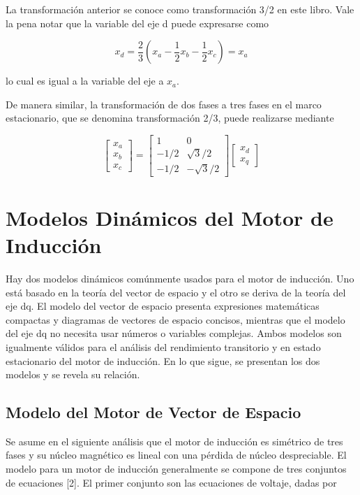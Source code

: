 \documentclass[letterpaper,12pt]{article} %
\begin{document}
La transformación anterior se conoce como transformación 3/2 en este libro. Vale la pena notar que la variable del eje d puede expresarse como

\[
x_d = \frac{2}{3} \left( x_a - \frac{1}{2}x_b - \frac{1}{2}x_c \right) = x_a \tag{14.2-7}
\]

lo cual es igual a la variable del eje a \(x_a\).

De manera similar, la transformación de dos fases a tres fases en el marco estacionario, que se denomina transformación 2/3, puede realizarse mediante

\[
\begin{bmatrix}
x_a \\
x_b \\
x_c 
\end{bmatrix} 
= 
\begin{bmatrix}
1 & 0 \\
-1/2 & \sqrt{3}/2 \\
-1/2 & -\sqrt{3}/2
\end{bmatrix}
\begin{bmatrix}
x_d \\
x_q 
\end{bmatrix} \tag{14.2-8}
\]

\section{Modelos Dinámicos del Motor de Inducción}

Hay dos modelos dinámicos comúnmente usados para el motor de inducción. Uno está basado en la teoría del vector de espacio y el otro se deriva de la teoría del eje dq. El modelo del vector de espacio presenta expresiones matemáticas compactas y diagramas de vectores de espacio concisos, mientras que el modelo del eje dq no necesita usar números o variables complejas. Ambos modelos son igualmente válidos para el análisis del rendimiento transitorio y en estado estacionario del motor de inducción. En lo que sigue, se presentan los dos modelos y se revela su relación.

\subsection{Modelo del Motor de Vector de Espacio}

Se asume en el siguiente análisis que el motor de inducción es simétrico de tres fases y su núcleo magnético es lineal con una pérdida de núcleo despreciable. El modelo para un motor de inducción generalmente se compone de tres conjuntos de ecuaciones [2]. El primer conjunto son las ecuaciones de voltaje, dadas por
\end{document}
